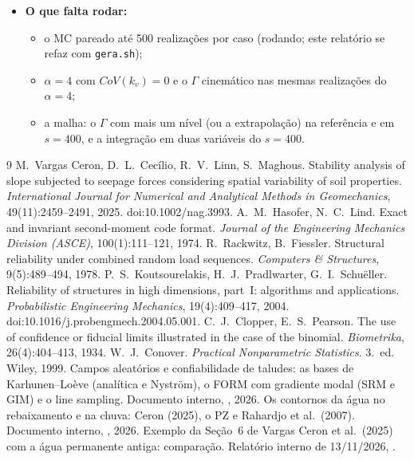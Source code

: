 \documentclass[11pt,a4paper]{article}
\begin{document}
\begin{itemize}
    custou de 3 a 7 análises. O MC direto para $CoV = 5\,\%$ pediria $400(1 - P_f)/P_f$ análises: 3100 na referência
    e $\approx 28\,000$ com $\alpha = 4$.
  \item \textbf{O que falta rodar:}
    \begin{itemize}
      \item o MC pareado até 500 realizações por caso (rodando; este relatório se refaz com \texttt{gera.sh});
      \item $\alpha = 4$ com $CoV(k_v) = 0$ e o $\Gamma$ cinemático nas mesmas realizações do $\alpha = 4$;
      \item a malha: o $\Gamma$ com mais um nível (ou a extrapolação) na referência e em $s = 400$, e a integração em
        duas variáveis do $s = 400$.
    \end{itemize}
\end{itemize}


\begin{thebibliography}{9}
 M.~Vargas Ceron, D.~L.~Cecílio, R.~V.~Linn, S.~Maghous. Stability analysis of slope subjected to
  seepage forces considering spatial variability of soil properties. \emph{International Journal for Numerical and
  Analytical Methods in Geomechanics}, 49(11):2459--2491, 2025. doi:10.1002/nag.3993.
 A.~M.~Hasofer, N.~C.~Lind. Exact and invariant second-moment code format. \emph{Journal of the
  Engineering Mechanics Division (ASCE)}, 100(1):111--121, 1974.
 R.~Rackwitz, B.~Fiessler. Structural reliability under combined random load sequences.
  \emph{Computers \& Structures}, 9(5):489--494, 1978.
 P.~S.~Koutsourelakis, H.~J.~Pradlwarter, G.~I.~Schuëller. Reliability of structures in
  high dimensions, part~I: algorithms and applications. \emph{Probabilistic Engineering Mechanics}, 19(4):409--417,
  2004. doi:10.1016/j.probengmech.2004.05.001.
 C.~J.~Clopper, E.~S.~Pearson. The use of confidence or fiducial limits illustrated in the case of
  the binomial. \emph{Biometrika}, 26(4):404--413, 1934.
 W.~J.~Conover. \emph{Practical Nonparametric Statistics}. 3.\ ed. Wiley, 1999.
 Campos aleatórios e confiabilidade de taludes: as bases de Karhunen--Loève (analítica e Nyström),
  o FORM com gradiente modal (SRM e GIM) e o line sampling. Documento interno,
  , 2026.
 Os contornos da água no rebaixamento e na chuva: Ceron (2025), o PZ e Rahardjo et al.\ (2007).
  Documento interno, , 2026.
 Exemplo da Seção~6 de Vargas Ceron et al.\ (2025) com a água permanente antiga: comparação.
  Relatório interno de 13/11/2026, .
\end{thebibliography}
\end{document}
